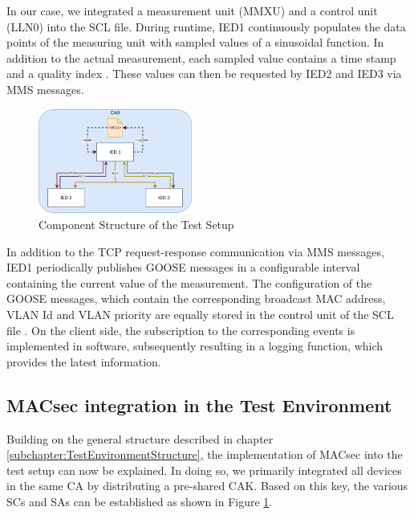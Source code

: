 \documentclass[conference, onecolumn, a4paper]{IEEEtran}
\begin{document}
\smallskip
In our case, we integrated a measurement unit (MMXU) \cite[p. 268]{IEC61850-7-4:2010} and a control unit (LLN0) \cite[p. 164]{IEC61850-7-4:2010} 
into the SCL file. During runtime, IED1 continuously populates the data points of the measuring unit with sampled values of a sinusoidal function. In 
addition to the actual measurement, each sampled value contains a time stamp and a quality index \cite[p. 61ff]{IEC61850-7-3:2010}. These values can 
then be requested by IED2 and IED3 via MMS messages.

\begin{figure}[h]
    \centering
    \includegraphics[width=0.45\textwidth]{images/TestSetupIEDs.png}
    \caption{Component Structure of the Test Setup}
    \label{image:MACsecTestSetup}
\end{figure}

\noindent In addition to the TCP request-response communication via MMS messages, IED1 periodically publishes GOOSE messages in a configurable interval 
containing the current value of the measurement. The configuration of the GOOSE messages, which contain the corresponding broadcast MAC address, VLAN 
Id and VLAN priority are equally stored in the control unit of the SCL file \cite[p. 189]{IEC61850-8-1:2011}. On the client side, the subscription to 
the corresponding events is implemented in software, subsequently resulting in a logging function, which provides the latest information. 

\subsection{MACsec integration in the Test Environment}
\label{subchapter:TestEnvironmentMACsec}
\noindent Building on the general structure described in chapter \ref{subchapter:TestEnvironmentStructure}, the implementation of MACsec into the test 
setup can now be explained. In doing so, we primarily integrated all devices in the same CA by distributing a pre-shared CAK. Based on this key, the 
various SCs and SAs can be established as shown in Figure \ref{image:MACsecTestSetup}.
\end{document}
